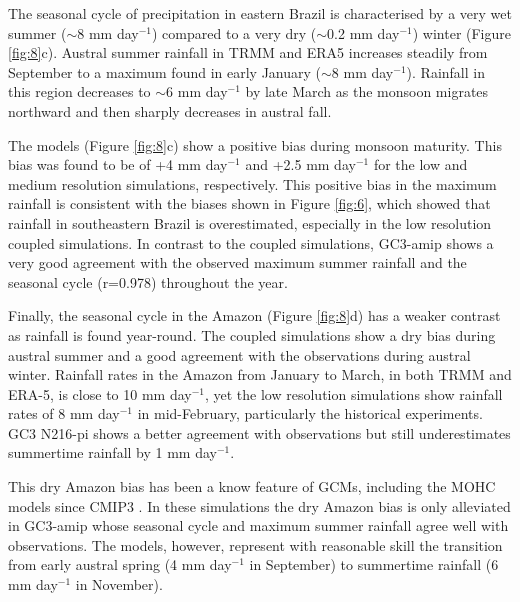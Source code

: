 The seasonal cycle of precipitation in eastern Brazil is characterised by a very wet summer ($\sim$8 mm day$^{-1}$) compared to a very dry ($\sim$0.2 mm day$^{-1}$) winter (Figure \ref{fig:8}c).
Austral summer rainfall in TRMM and ERA5 increases steadily from September to a maximum found in early January ($\sim$8 mm day$^{-1}$).
Rainfall in this region decreases to $\sim$6 mm day$^{-1}$ by late March as the monsoon migrates northward and then sharply decreases in austral fall.


The models (Figure \ref{fig:8}c) show a positive bias during monsoon maturity. This bias was found to be of +4 mm day$^{-1}$ and +2.5 mm day$^{-1}$ for the low and medium resolution simulations, respectively.
This positive bias in the maximum rainfall is consistent with the biases shown in Figure \ref{fig:6}, which showed that rainfall in southeastern Brazil is overestimated, especially in the low resolution coupled simulations.   In contrast to the coupled simulations, GC3-amip shows a very good agreement with the observed maximum summer rainfall and the seasonal cycle (r=0.978) throughout the year.

Finally, the seasonal cycle in the Amazon (Figure \ref{fig:8}d) has a weaker contrast as rainfall is found year-round. The coupled simulations show a dry bias during austral summer and a good agreement with the observations during austral winter. Rainfall rates in the Amazon from January to March, in both TRMM and ERA-5, is close to 10 mm day$^{-1}$, yet the low resolution simulations show rainfall rates of 8 mm day$^{-1}$ in mid-February, particularly the historical experiments.
GC3 N216-pi shows a better agreement with observations but still underestimates summertime rainfall by 1 mm day$^{-1}$.   

This dry Amazon bias has been a know feature of GCMs, including the MOHC models since CMIP3 \citep{li2006,yin2013}. In these simulations the dry Amazon bias is only alleviated in GC3-amip whose seasonal cycle and maximum summer rainfall agree well with observations.   
The models, however, represent with reasonable skill the transition from
early austral spring (4 mm day$^{-1}$ in September) to summertime rainfall (6 mm day$^{-1}$ in November).


